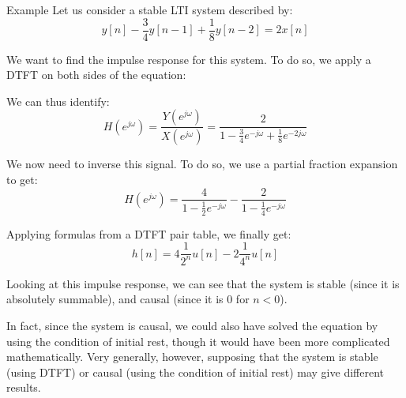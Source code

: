 \documentclass[a4paper]{article}
\begin{document}
\begin{parag}{Example}
    Let us consider a stable LTI system described by: 
    \[y\left[n\right] - \frac{3}{4} y\left[n-1\right] + \frac{1}{8} y\left[n-2\right] = 2x\left[n\right]\]

    We want to find the impulse response for this system. To do so, we apply a DTFT on both sides of the equation: 
    
    We can thus identify: 
    \[H\left(e^{j\omega}\right) = \frac{Y\left(e^{j \omega}\right)}{X\left(e^{j \omega}\right)} = \frac{2}{1 - \frac{3}{4} e^{-j\omega} + \frac{1}{8} e^{-2 j \omega}}\]
    
    We now need to inverse this signal. To do so, we use a partial fraction expansion to get: 
    \[H\left(e^{j \omega}\right) = \frac{4}{1 - \frac{1}{2} e^{-j \omega}} - \frac{2}{1 - \frac{1}{4} e^{-j \omega}}\]
    
    Applying formulas from a DTFT pair table, we finally get:
    \[h\left[n\right] = 4\frac{1}{2^n} u\left[n\right] - 2 \frac{1}{4^n} u\left[n\right]\]

    Looking at this impulse response, we can see that the system is stable (since it is absolutely summable), and causal (since it is 0 for $n < 0$).

    In fact, since the system is causal, we could also have solved the equation by using the condition of initial rest, though it would have been more complicated mathematically. Very generally, however, supposing that the system is stable (using DTFT) or causal (using the condition of initial rest) may give different results.
\end{parag}
\end{document}
